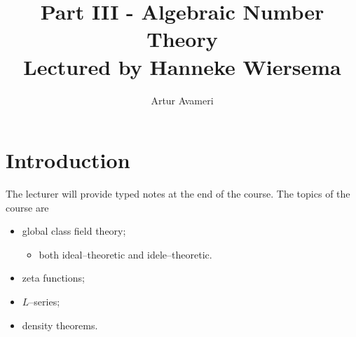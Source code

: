 \documentclass{article}
\title{Part III - Algebraic Number Theory
    \\ \large
    Lectured by Hanneke Wiersema 
}
\author{Artur Avameri}
\date{}
\theoremstyle{definition}
\begin{document}
\maketitle
\tableofcontents
\newpage
 
\section{Introduction}



The lecturer will provide typed notes at the end of the course. The topics of the course are
\begin{itemize}
    \item global class field theory;
    \begin{itemize}
        \item both ideal--theoretic and idele--theoretic.
    \end{itemize}
    \item zeta functions;
    \item $L$--series;
    \item density theorems.
\end{itemize} 
\end{document}
